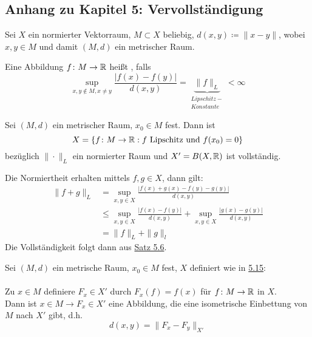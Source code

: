 \subsection*{Anhang zu Kapitel 5: Vervollständigung}
Sei $X$ ein normierter Vektorraum, $M \subset X$ beliebig, $d(x, y) \coloneqq \| x - y \|$, wobei $x, y \in M$ und damit $(M, d)$ ein metrischer Raum.


\begin{definition} \label{def:5.15-Lipschitz}
	Eine Abbildung $f \colon M \rightarrow \mathbb{R}$ hei{\ss}t , falls
	\[ \sup_{x, y \notin M, x \neq y} \frac{|f(x) - f(y)|}{d(x, y)} = \underbrace{\| f \|_{L}}_{\begin{matrix} Lipschitz- \\ Konstante \end{matrix}} < \infty \]
\end{definition}


\begin{bemerkung}
	Sei $(M, d)$ ein metrischer Raum, $x_{0} \in M$ fest. Dann ist \\
	\[ X = \{ f \colon M \rightarrow \mathbb{R} : f \text{ Lipschitz und } f(x_{0}) = 0 \} \]	
	bezüglich $\| \cdot \|_{L}$ ein normierter Raum und $X' = B(X, \mathbb{R})$ ist vollständig.
	\begin{beweis}
		Die Normiertheit erhalten mittels $f, g \in X$, dann gilt:  
		\begin{align*}
			\| f + g \|_{L} & = \sup_{x, y \in X} \frac{|f(x) + g(x) - f(y) - g(y)|}{d(x, y)} \\
							& \leq \sup_{x, y \in X} \frac{|f(x) - f(y)|}{d(x, y)} + \sup_{x, y \in X} \frac{|g(x) - g(y)|}{d(x, y)} \\
							& = \| f \|_{L} + \| g \|_{l} 			
		\end{align*}
		Die Vollständigkeit folgt dann aus \hyperref[satz:5.6]{Satz 5.6}. 
	\end{beweis}
\end{bemerkung}


\begin{satz} \label{satz:5-17}
	Sei $(M,d)$ ein metrische Raum, $x_{0} \in M$ fest, $X$ definiert wie in \hyperref[def:5.15-Lipschitz]{5.15}: \\ \\
	Zu $x \in M$ definiere $F_{x} \in X'$ durch $F_{x}(f) = f(x)$ für $f \colon M \rightarrow \mathbb{R}$ in $X$. \\
	Dann ist $x \in M \rightarrow F_{x} \in X'$ eine Abbildung, die eine isometrische Einbettung von $M$ nach $X'$ gibt, d.h. 
	\[ d(x, y) = \| F_{x} - F_{y} \|_{X'} \]
\end{satz}

